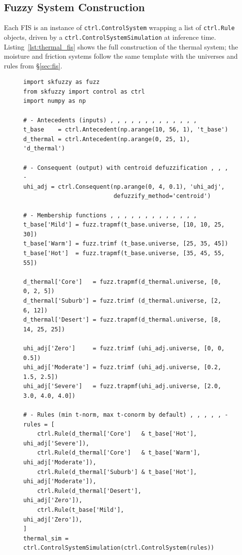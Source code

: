 \documentclass[conference]{IEEEtran}
\begin{document}
\subsection{Fuzzy System Construction}

Each FIS is an instance of \texttt{ctrl.ControlSystem} wrapping a list of
\texttt{ctrl.Rule} objects, driven by a
\texttt{ctrl.ControlSystemSimulation} at inference time.
Listing~\ref{lst:thermal_fis} shows the full construction of the thermal
system; the moisture and friction systems follow the same template with
the universes and rules from \S\ref{sec:fis}.

\begin{figure}[!t]
\begin{lstlisting}[caption={Construction of the Thermal FIS (antecedents,
membership functions, rules).  Moisture and Friction FIS follow the same
template.},
label={lst:thermal_fis}]
import skfuzzy as fuzz
from skfuzzy import control as ctrl
import numpy as np

# - Antecedents (inputs) , , , , , , , , , , , , , 
t_base    = ctrl.Antecedent(np.arange(10, 56, 1), 't_base')
d_thermal = ctrl.Antecedent(np.arange(0, 25, 1),  'd_thermal')

# - Consequent (output) with centroid defuzzification , , , -
uhi_adj = ctrl.Consequent(np.arange(0, 4, 0.1), 'uhi_adj',
                          defuzzify_method='centroid')

# - Membership functions , , , , , , , , , , , , , 
t_base['Mild'] = fuzz.trapmf(t_base.universe, [10, 10, 25, 30])
t_base['Warm'] = fuzz.trimf (t_base.universe, [25, 35, 45])
t_base['Hot']  = fuzz.trapmf(t_base.universe, [35, 45, 55, 55])

d_thermal['Core']   = fuzz.trapmf(d_thermal.universe, [0, 0, 2, 5])
d_thermal['Suburb'] = fuzz.trimf (d_thermal.universe, [2, 6, 12])
d_thermal['Desert'] = fuzz.trapmf(d_thermal.universe, [8, 14, 25, 25])

uhi_adj['Zero']     = fuzz.trimf (uhi_adj.universe, [0, 0, 0.5])
uhi_adj['Moderate'] = fuzz.trimf (uhi_adj.universe, [0.2, 1.5, 2.5])
uhi_adj['Severe']   = fuzz.trapmf(uhi_adj.universe, [2.0, 3.0, 4.0, 4.0])

# - Rules (min t-norm, max t-conorm by default) , , , , , -
rules = [
    ctrl.Rule(d_thermal['Core']   & t_base['Hot'],  uhi_adj['Severe']),
    ctrl.Rule(d_thermal['Core']   & t_base['Warm'], uhi_adj['Moderate']),
    ctrl.Rule(d_thermal['Suburb'] & t_base['Hot'],  uhi_adj['Moderate']),
    ctrl.Rule(d_thermal['Desert'],                  uhi_adj['Zero']),
    ctrl.Rule(t_base['Mild'],                       uhi_adj['Zero']),
]
thermal_sim = ctrl.ControlSystemSimulation(ctrl.ControlSystem(rules))
\end{lstlisting}
\end{figure}
\end{document}
